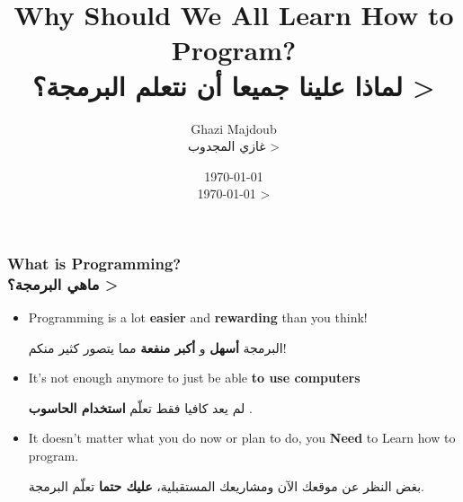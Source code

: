 \documentclass[9pt]{beamer}
\begin{document}

\title{		Why Should We All Learn How to Program?\\ 
			\<
			لماذا علينا جميعا أن نتعلم البرمجة؟
			>
} %
\author{	Ghazi Majdoub\\
			\< 
			غازي المجدوب
			>
}
\date{
			\today\\
			\<
			\today
			>
}

	\begin{frame}
		\titlepage
	\end{frame}
	
	
	\begin{frame}
		\frametitle{
			What is Programming?\\
			\<
			ماهي البرمجة؟
			>
		}
		
		\begin{itemize}
			\item	Programming is a lot \textbf{easier} and \textbf{rewarding} than you think!
					\begin{arabtext}
					البرمجة
					\textbf{
						أسهل
					}
					و
					\textbf
					{
						أكبر منفعة
					}
					مما يتصور كثير منكم!
					\end{arabtext}
			\item 	It's not enough anymore to just be able \textbf{to use computers}
					\begin{arabtext}
					لم يعد كافيا فقط تعلّم 
					\textbf{
						استخدام الحاسوب
					}.
					\end{arabtext}
			\item 	It doesn't matter what you do now or plan to do, you \textbf{Need} to Learn how to program.
					\begin{arabtext}
					بغض النظر عن موقعك الآن ومشاريعك المستقبلية،
					\textbf{
						عليك حتما
					}
					تعلّم البرمجة.
					\end{arabtext}
		\end{itemize}
	\end{frame}
	
\end{document}
